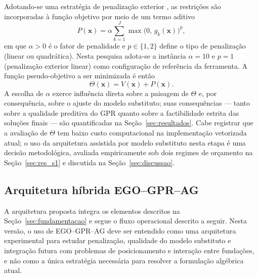 Adotando-se uma estratégia de penalização exterior , as restrições são incorporadas à função objetivo por meio de um termo aditivo
\begin{equation}
    P(\bm{x}) = \alpha \sum_{k=1}^{J} \max\bigl(0,\, g_k(\bm{x})\bigr)^p,
    \label{eq:penalizacao}
\end{equation}
em que $\alpha > 0$ é o fator de penalidade e $p \in \{1, 2\}$ define o tipo de penalização (linear ou quadrática). Nesta pesquisa adota-se a instância $\alpha = 10$ e $p = 1$ (penalização exterior linear) como configuração de referência da ferramenta. A função pseudo-objetivo a ser minimizada é então
\begin{equation}
    \Theta(\bm{x}) = V(\bm{x}) + P(\bm{x}).
    \label{eq:pseudo_objetivo}
\end{equation}
A escolha de $\alpha$ exerce influência direta sobre a paisagem de $\Theta$ e, por consequência, sobre o ajuste do modelo substituto; suas consequências — tanto sobre a qualidade preditiva do GPR quanto sobre a factibilidade estrita das soluções finais — são quantificadas na Seção~\ref{sec:resultados}. Cabe registrar que a avaliação de $\Theta$ tem baixo custo computacional na implementação vetorizada atual; o uso da arquitetura assistida por modelo substituto nesta etapa é uma decisão metodológica, avaliada empiricamente sob dois regimes de orçamento na Seção~\ref{sec:res_s1} e discutida na Seção~\ref{sec:discussao}.

\subsection{Arquitetura híbrida EGO--GPR--AG}
\label{sec:met_arquitetura}

A arquitetura proposta integra os elementos descritos na Seção~\ref{sec:fundamentacao} e segue o fluxo operacional descrito a seguir. Nesta versão, o uso de EGO--GPR--AG deve ser entendido como uma arquitetura experimental para estudar penalização, qualidade do modelo substituto e integração futura com problemas de posicionamento e interação entre fundações, e não como a única estratégia necessária para resolver a formulação algébrica atual.

